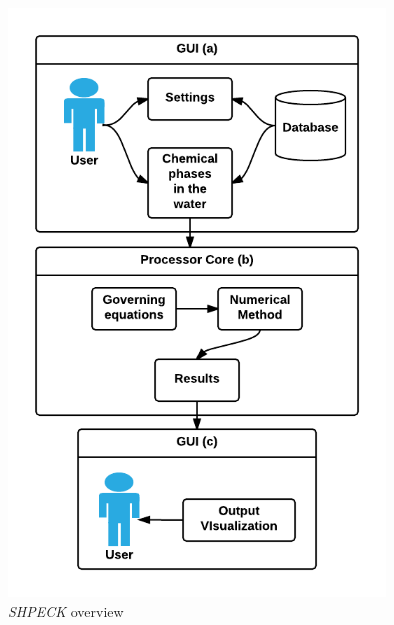 \begin{figure}[ht!]
\centering
\includegraphics[width=100mm]{figures/shpeck_flow.png}
\caption{\emph{SHPECK} overview}
\label{fig:shpeck_flow}
\end{figure}

